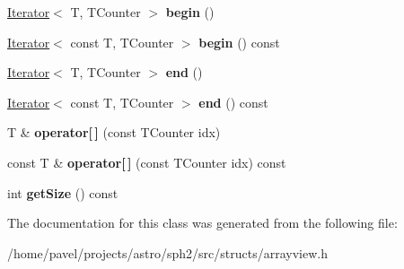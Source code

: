 \begin{DoxyCompactItemize}
\hyperlink{classIterator}{Iterator}$<$ T, T\+Counter $>$ {\bfseries begin} ()
\item 
\hypertarget{classArrayView_a36d4ca146561aa28a34cd1dab265bfa7}{}\label{classArrayView_a36d4ca146561aa28a34cd1dab265bfa7} 
\hyperlink{classIterator}{Iterator}$<$ const T, T\+Counter $>$ {\bfseries begin} () const
\item 
\hypertarget{classArrayView_a4b45a5022db66eb8756e6fa367ec2b43}{}\label{classArrayView_a4b45a5022db66eb8756e6fa367ec2b43} 
\hyperlink{classIterator}{Iterator}$<$ T, T\+Counter $>$ {\bfseries end} ()
\item 
\hypertarget{classArrayView_a53614bd711745a629ba1610aa0a54b71}{}\label{classArrayView_a53614bd711745a629ba1610aa0a54b71} 
\hyperlink{classIterator}{Iterator}$<$ const T, T\+Counter $>$ {\bfseries end} () const
\item 
\hypertarget{classArrayView_afecc27ee9a9ee1ee5b8f8f2328957ad7}{}\label{classArrayView_afecc27ee9a9ee1ee5b8f8f2328957ad7} 
T \& {\bfseries operator\mbox{[}$\,$\mbox{]}} (const T\+Counter idx)
\item 
\hypertarget{classArrayView_a4004286643a5488b4696fbabac87b785}{}\label{classArrayView_a4004286643a5488b4696fbabac87b785} 
const T \& {\bfseries operator\mbox{[}$\,$\mbox{]}} (const T\+Counter idx) const
\item 
\hypertarget{classArrayView_abbb0ed5009a3070dff94fb9545c96843}{}\label{classArrayView_abbb0ed5009a3070dff94fb9545c96843} 
int {\bfseries get\+Size} () const
\end{DoxyCompactItemize}


The documentation for this class was generated from the following file\+:\begin{DoxyCompactItemize}
\item 
/home/pavel/projects/astro/sph2/src/structs/arrayview.\+h\end{DoxyCompactItemize}

